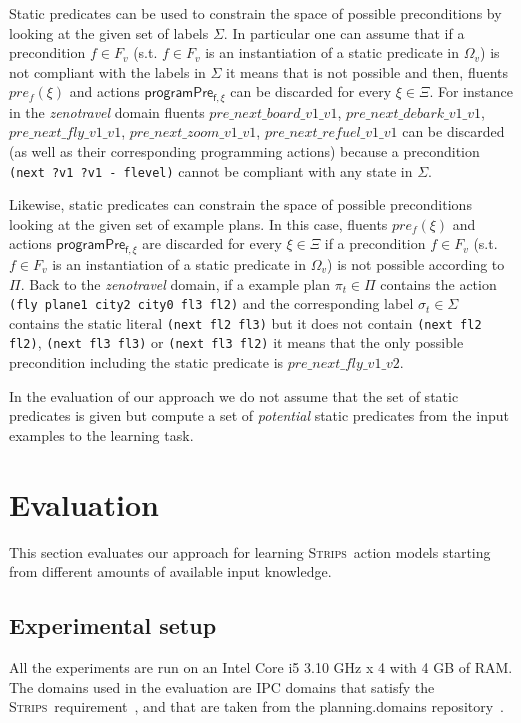 \documentclass[letterpaper]{article} %
\newcommand{\strips}{\textsc{Strips}}     %
\begin{document}
Static predicates can be used to constrain the space of possible preconditions by looking at the given set of labels $\Sigma$. In particular one can assume that if a precondition $f\in F_v$ (s.t. $f\in F_v$ is an instantiation of a static predicate in $\Omega_v$) is not compliant with the labels in $\Sigma$ it means that is not possible and then, fluents $pre_f(\xi)$ and actions $\mathsf{programPre_{f,\xi}}$ can be discarded for every $\xi\in\Xi$. For instance in the {\em zenotravel} domain fluents $pre\_next\_board\_v1\_v1$, $pre\_next\_debark\_v1\_v1$, $pre\_next\_fly\_v1\_v1$, $pre\_next\_zoom\_v1\_v1$, $pre\_next\_refuel\_v1\_v1$ can be discarded (as well as their corresponding programming actions) because a precondition {\tt\small(next ?v1 ?v1 - flevel)} cannot be compliant with any state in $\Sigma$.

Likewise, static predicates can constrain the space of possible preconditions looking at the given set of example plans. In this case, fluents $pre_f(\xi)$ and actions $\mathsf{programPre_{f,\xi}}$ are discarded for every $\xi\in\Xi$ if a precondition $f\in F_v$ (s.t. $f\in F_v$ is an instantiation of a static predicate in $\Omega_v$) is not possible according to $\Pi$. Back to the {\em zenotravel} domain, if a example plan $\pi_t\in \Pi$ contains the action {\tt\small (fly plane1 city2 city0 fl3 fl2)} and the corresponding label $\sigma_t\in\Sigma$ contains the static literal {\tt\small (next fl2 fl3)} but it does not contain {\tt\small (next fl2 fl2)}, {\tt\small (next fl3 fl3)} or {\tt\small (next fl3 fl2)} it means that the only possible precondition including the static predicate is $pre\_next\_fly\_v1\_v2$.

In the evaluation of our approach we do not assume that the set of static predicates is given but compute a set of {\em potential} static predicates from the input examples to the learning task.


\section{Evaluation}
This section evaluates our approach for learning \strips\ action models starting from different amounts of available input knowledge.

\subsection{Experimental setup}
All the experiments are run on an Intel Core i5 3.10 GHz x 4 with 4 GB of RAM. The domains used in the evaluation are IPC domains that satisfy the \strips\ requirement~\cite{fox2003pddl2}, and that are taken from the {\sc planning.domains} repository~\cite{muise2016planning}.
\end{document}
